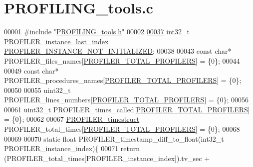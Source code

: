 \hypertarget{_p_r_o_f_i_l_i_n_g__tools_8c_source}{\section{\-P\-R\-O\-F\-I\-L\-I\-N\-G\-\_\-tools.\-c}
}

\begin{DoxyCode}
00001 \textcolor{preprocessor}{#include "\hyperlink{_p_r_o_f_i_l_i_n_g__tools_8h}{PROFILING_tools.h}"}
00002 
\hypertarget{_p_r_o_f_i_l_i_n_g__tools_8c_source_l00037}{}\hyperlink{_p_r_o_f_i_l_i_n_g__tools_8h_ab45d681232a34daa38cb1419306a1bf2}{00037} int32\_t \hyperlink{_p_r_o_f_i_l_i_n_g__tools_8c_ab45d681232a34daa38cb1419306a1bf2}{PROFILER_instance_last_index} = \hyperlink{_p_r_o_f_i_l_i_n_g__tools_8h_adfa1dd598814dd5a5c73276c47cba92d}{PROFILER_INSTANCE_NOT_INITIALIZED};
00038 
00043 \textcolor{keyword}{const} \textcolor{keywordtype}{char}* PROFILER\_files\_names[\hyperlink{group___xD0_x9F_xD0_xBE_xD1_x80_xD1_x82_xD0_xB8_xD1_x80_xD1_x83_xD0_xB5_xD0_xBC_xD0_xB0_xD1_x8F_2ef1b31e26d7139e4bfe94879d1322e3_ga775939d541e95ea75e6e7066a1cc6bcb}{PROFILER_TOTAL_PROFILERS}] = \{0\};
00044 
00049 \textcolor{keyword}{const} \textcolor{keywordtype}{char}* PROFILER\_procedures\_names[\hyperlink{group___xD0_x9F_xD0_xBE_xD1_x80_xD1_x82_xD0_xB8_xD1_x80_xD1_x83_xD0_xB5_xD0_xBC_xD0_xB0_xD1_x8F_2ef1b31e26d7139e4bfe94879d1322e3_ga775939d541e95ea75e6e7066a1cc6bcb}{PROFILER_TOTAL_PROFILERS}] = \{0\};
00050 
00055 uint32\_t PROFILER\_lines\_numbers[\hyperlink{group___xD0_x9F_xD0_xBE_xD1_x80_xD1_x82_xD0_xB8_xD1_x80_xD1_x83_xD0_xB5_xD0_xBC_xD0_xB0_xD1_x8F_2ef1b31e26d7139e4bfe94879d1322e3_ga775939d541e95ea75e6e7066a1cc6bcb}{PROFILER_TOTAL_PROFILERS}] = \{0\};
00056 
00061 uint32\_t PROFILER\_times\_called[\hyperlink{group___xD0_x9F_xD0_xBE_xD1_x80_xD1_x82_xD0_xB8_xD1_x80_xD1_x83_xD0_xB5_xD0_xBC_xD0_xB0_xD1_x8F_2ef1b31e26d7139e4bfe94879d1322e3_ga775939d541e95ea75e6e7066a1cc6bcb}{PROFILER_TOTAL_PROFILERS}] = \{0\};
00062 
00067 \hyperlink{group___xD0_x9F_xD0_xBE_xD1_x80_xD1_x82_xD0_xB8_xD1_x80_xD1_x83_xD0_xB5_xD0_xBC_xD0_xB0_xD1_x8F_2ef1b31e26d7139e4bfe94879d1322e3_gae02193769f3b21a09fc0d5035e566a75}{PROFILER_timestruct} PROFILER\_total\_times[\hyperlink{group___xD0_x9F_xD0_xBE_xD1_x80_xD1_x82_xD0_xB8_xD1_x80_xD1_x83_xD0_xB5_xD0_xBC_xD0_xB0_xD1_x8F_2ef1b31e26d7139e4bfe94879d1322e3_ga775939d541e95ea75e6e7066a1cc6bcb}{PROFILER_TOTAL_PROFILERS}] = \{0\};
00068 
00069 
00070 \textcolor{keyword}{static} \textcolor{keywordtype}{float} PROFILER\_timestamp\_diff\_to\_float(int32\_t PROFILER\_instance\_index)\{
00071     \textcolor{keywordflow}{return} (PROFILER\_total\_times[PROFILER\_instance\_index]).tv\_sec +

\end{DoxyCode}
